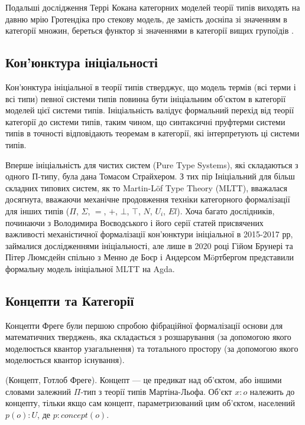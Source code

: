 Подальші дослідження Террі Кокана категорних моделей теорії типів виходять на давню мрію
Гротендіка про стекову модель, де замість досніпа зі значенням в категорії множин,
береться функтор зі значеннями в категорії вищих групоїдів \cite{Coquand17Stack}.

\subsection{Кон'юнктура ініціальності}
Кон'юнктура ініціальної в теорії типів стверджує, що модель термів (всі терми і всі типи)
певної системи типів повинна бути ініціальним об'єктом в категорії моделей цієї
системи типів. Ініціальність валідує формальний перехід від теорії категорії до
системи типів, таким чином, що синтаксичні пруфтерми системи типів в точності
відповідають теоремам в категорії, які інтерпретують ці системи типів.

Вперше ініціальність для чистих систем (Pure Type Systems), які складаються з одного П-типу,
була дана Томасом Страйхером. З тих пір Ініціальний для більш складних
типових систем, як то Martin-Löf Type Theory (MLTT), вважалася досягнута, вважаючи
механічне продовження техніки категорного формалізації для інших типів ($\Pi$, $\Sigma$, $=$, $+$, $\bot$, $\top$, $N$, $U_i$, $El$).
Хоча багато дослідників, починаючи з Володимира Воєводського і його серії статей
присвячених важливості механістичної формалізації кон'юнктури ініціальної в 2015-2017 рр,
займалися дослідженнями ініціальності, але лише в 2020 році Гійом Брунері та Пітер Люмсдейн
спільно з Менно де Боєр і Андерсом Мöртбергом представили формальну модель ініціальної
MLTT на Agda.


\newpage
\subsection{Концепти та Категорії}
Концепти Фреге були першою спробою фібраційної формалізації основи для математичних тверджень,
яка складається з розшарування (за допомогою якого моделюється квантор узагальнення) та
тотального простору (за допомогою якого моделюється квантор існування).

\begin{definition} (Концепт, Готлоб Фреге).
Концепт --- це предикат над об'єктом, або іншими словами залежний $\Pi$-тип з теорії типів Мартіна-Льофа.
Об'єкт $x : o$ належить до концепту, тільки якщо сам концепт,
параметризований цим об'єктом, населений $p(o) : U$, де $p : concept(o)$.
\end{definition}

